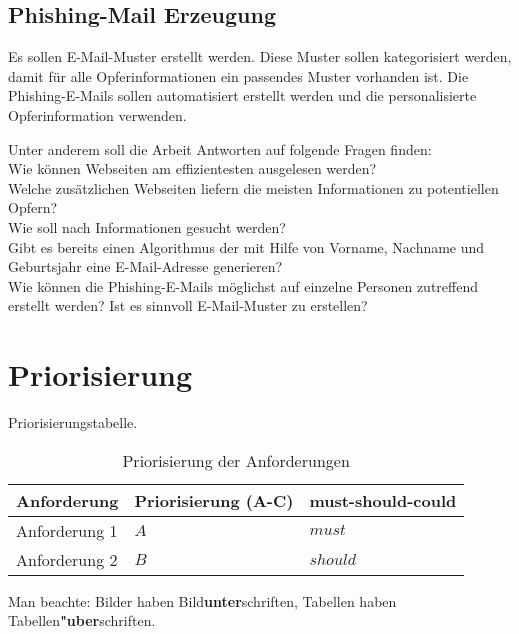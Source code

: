 	\subsection{Phishing-Mail Erzeugung}
	Es sollen E-Mail-Muster erstellt werden. Diese Muster sollen kategorisiert werden, damit für alle Opferinformationen ein passendes Muster vorhanden ist.
	Die Phishing-E-Mails sollen automatisiert erstellt werden und die personalisierte Opferinformation verwenden.

Unter anderem soll die Arbeit Antworten auf folgende Fragen finden:\\
Wie können Webseiten am effizientesten ausgelesen werden?\\
Welche zusätzlichen Webseiten liefern die meisten Informationen zu potentiellen Opfern?\\
Wie soll nach Informationen gesucht werden?\\
Gibt es bereits einen Algorithmus der mit Hilfe von Vorname, Nachname und Geburtsjahr eine E-Mail-Adresse generieren?\\
Wie können die Phishing-E-Mails möglichst auf einzelne Personen zutreffend erstellt werden? Ist es sinnvoll E-Mail-Muster zu erstellen?\\

\subsection{} %
\label{sse:}
\subsubsection{} %
\label{sss:}
\FloatBarrier
\section{Priorisierung} %
\label{sec:} %
Priorisierungstabelle.

\begin{table}
	\begin{center}
		\caption{Priorisierung der Anforderungen}
		\label{matrizen}
		\begin{tabular}{|l|l|l|}
			\hline
			Anforderung & Priorisierung (A-C) & must-should-could\\
			\hline
			Anforderung 1 & $ A $ & $must$   \\
			\hline
			Anforderung 2 & $ B $ & $should$  \\
			\hline
		\end{tabular}
	\end{center}
\end{table}
\FloatBarrier
Man beachte: Bilder haben Bild{\bf unter}schriften, 
Tabellen haben Tabellen{\bf "uber}schriften.